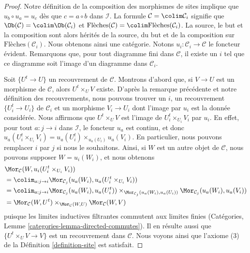 \begin{proof}
Notre définition de la composition des morphismes de sites implique que
$u_b \circ u_a = u_c$ dès que $c = a \circ b$ dans $\mathcal{I}$.
La formule $\mathcal{C} = \colim \mathcal{C}_i$ signifie que
$\Ob(\mathcal{C}) = \colim \Ob(\mathcal{C}_i)$ et
$\text{Flèches}(\mathcal{C}) = \colim \text{Flèches}(\mathcal{C}_i)$.
La source, le but et la composition sont alors hérités de la source,
du but et de la composition sur $\text{Flèches}(\mathcal{C}_i)$.
Nous obtenons ainsi une catégorie.
Notons $u_i : \mathcal{C}_i \to \mathcal{C}$ le foncteur évident.
Remarquons que, pour tout diagramme fini dans $\mathcal{C}$,
il existe un $i$ tel que ce diagramme soit l’image d’un diagramme
dans $\mathcal{C}_i$.

\medskip\noindent
Soit $\{U^t \to U\}$ un recouvrement de $\mathcal{C}$. Montrons d’abord que,
si $V \to U$ est un morphisme de $\mathcal{C}$, alors $U^t \times_U V$ existe.
D’après la remarque précédente et notre définition des recouvrements,
nous pouvons trouver un $i$, un recouvrement $\{U_i^t \to U_i\}$ de
$\mathcal{C}_i$ et un morphisme $V_i \to U_i$ dont l’image par $u_i$
est la donnée considérée. Nous affirmons que $U^t \times_U V$ est l’image de
$U^t_i \times_{U_i} V_i$ par $u_i$.
En effet, pour tout $a : j \to i$ dans $\mathcal{I}$, le foncteur $u_a$
est continu, et donc
$u_a(U^t_i \times_{U_i} V_i) = u_a(U^t_i) \times_{u_a(U_i)} u_a(V_i)$.
En particulier, nous pouvons remplacer $i$ par $j$ si nous le souhaitons.
Ainsi, si $W$ est un autre objet de $\mathcal{C}$, nous pouvons supposer
$W = u_i(W_i)$, et nous obtenons
\begin{align*}
& \Mor_\mathcal{C}(W, u_i(U^t_i \times_{U_i} V_i)) \\
& =
\colim_{a : j \to i}
\Mor_{\mathcal{C}_j}(u_a(W_i), u_a(U^t_i \times_{U_i} V_i)) \\
& =
\colim_{a : j \to i}
\Mor_{\mathcal{C}_j}(u_a(W_i), u_a(U^t_i))
\times_{\Mor_{\mathcal{C}_j}(u_a(W_i), u_a(U_i))}
\Mor_{\mathcal{C}_j}(u_a(W_i), u_a(V_i)) \\
& =
\Mor_\mathcal{C}(W, U^t)
\times_{\Mor_\mathcal{C}(W, U)}
\Mor_\mathcal{C}(W, V)
\end{align*}
puisque les limites inductives filtrantes commutent aux limites finies
(Catégories, Lemme \ref{categories-lemma-directed-commutes}).
Il en résulte aussi que
$\{U^t \times_U V \to V\}$ est un recouvrement dans $\mathcal{C}$.
Nous voyons ainsi que l’axiome (3) de la Définition \ref{definition-site}
est satisfait.


\end{proof}
